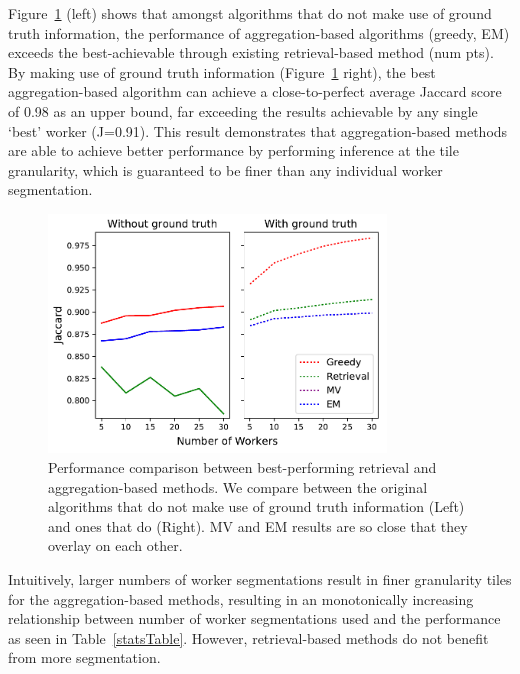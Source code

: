 \par \noindent Figure~\ref{retrieval_vs_aggregation} (left) shows that amongst algorithms that do not make use of ground truth information, the performance of aggregation-based algorithms (greedy, EM) exceeds the best-achievable through existing retrieval-based method (num pts). By making use of ground truth information  (Figure~\ref{retrieval_vs_aggregation} right), the best aggregation-based algorithm can achieve a close-to-perfect average Jaccard score of 0.98 as an upper bound, far exceeding the results achievable by any single `best' worker (J=0.91). This result demonstrates that aggregation-based methods are able to achieve better performance by performing inference at the tile granularity, which is guaranteed to be finer than any individual worker segmentation. 

\begin{figure}[h!]
   \vspace{-7pt}
   \centering
   \includegraphics[width=0.8\textwidth]{plots/Retrieval_vs_Aggregation.pdf}
   \caption{Performance comparison between best-performing retrieval and aggregation-based methods. We compare between the original algorithms that do not make use of ground truth information (Left) and ones that do (Right). MV and EM results are so close that they overlay on each other.  }
   \label{retrieval_vs_aggregation}   
   \setlength{\belowcaptionskip}{-15pt}
\end{figure} 


\par \noindent Intuitively, larger numbers of worker segmentations result in finer granularity tiles for the aggregation-based methods, resulting in an monotonically increasing relationship between number of worker segmentations used and the performance as seen in Table~\ref{statsTable}. However, retrieval-based methods do not benefit from more segmentation.

